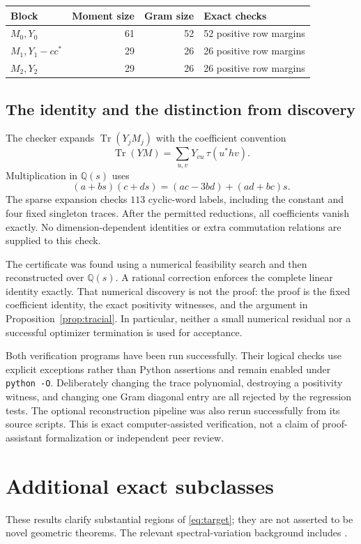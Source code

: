 \documentclass[11pt]{article}
\theoremstyle{definition}\newtheorem{definition}[theorem]{Definition}
\theoremstyle{remark}\newtheorem{remark}[theorem]{Remark}
\newcommand{\Tr}{\operatorname{Tr}}
\begin{document}
\begin{center}
\begin{tabular}{@{}lrrl@{}}
\toprule
Block & Moment size & Gram size & Exact checks\\
\midrule
$M_0,Y_0$ &61&52&52 positive row margins\\
$M_1,Y_1-cc^*$ &29&26&26 positive row margins\\
$M_2,Y_2$ &29&26&26 positive row margins\\
\bottomrule
\end{tabular}
\end{center}

\subsection{The identity and the distinction from discovery}
The checker expands $\Tr(Y_jM_j)$ with the coefficient convention
\[
 \Tr(YM)=\sum_{u,v}Y_{vu}\,\tau(u^*hv).
\]
Multiplication in $\mathbb Q(s)$ uses
\[
 (a+bs)(c+ds)=(ac-3bd)+(ad+bc)s.
\]
The sparse expansion checks $113$ cyclic-word labels, including the constant and four fixed singleton traces. After the permitted reductions, all coefficients vanish exactly. No dimension-dependent identities or extra commutation relations are supplied to this check.

The certificate was found using a numerical feasibility search and then reconstructed over $\mathbb Q(s)$. A rational correction enforces the complete linear identity exactly. That numerical discovery is not the proof: the proof is the fixed coefficient identity, the exact positivity witnesses, and the argument in Proposition~\ref{prop:tracial}. In particular, neither a small numerical residual nor a successful optimizer termination is used for acceptance.

Both verification programs have been run successfully. Their logical checks use explicit exceptions rather than Python assertions and remain enabled under \texttt{python -O}. Deliberately changing the trace polynomial, destroying a positivity witness, and changing one Gram diagonal entry are all rejected by the regression tests. The optional reconstruction pipeline was also rerun successfully from its source scripts. This is exact computer-assisted verification, not a claim of proof-assistant formalization or independent peer review.

\section{Additional exact subclasses}
These results clarify substantial regions of \eqref{eq:target}; they are not asserted to be novel geometric theorems. The relevant spectral-variation background includes \cite{bhatia}.
\end{document}
